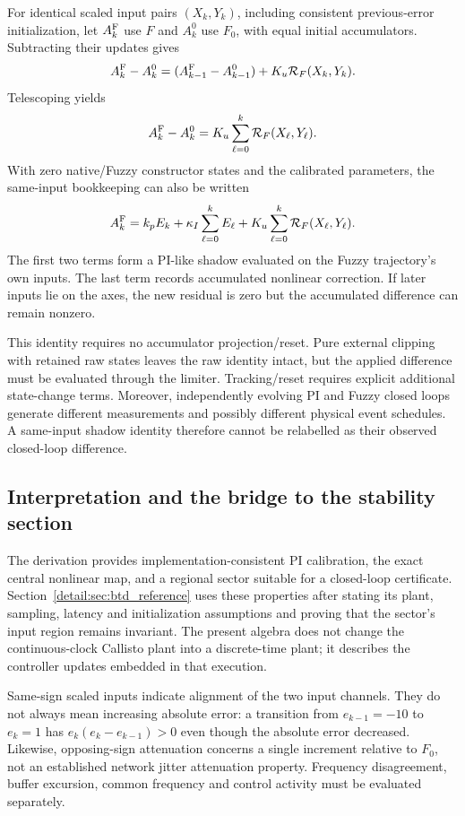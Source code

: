 For identical scaled input pairs $(X_k,Y_k)$, including consistent
previous-error initialization, let $A_k^{\rm F}$ use $F$ and
$A_k^0$ use $F_0$, with equal initial accumulators. Subtracting their
updates gives
\[
 A_k^{\rm F}-A_k^0=(A_{k-1}^{\rm F}-A_{k-1}^0)
                  +K_u\mathcal R_F(X_k,Y_k).
\]
Telescoping yields
\begin{equation}
 A_k^{\rm F}-A_k^0=K_u\sum_{\ell=0}^{k}\mathcal R_F(X_\ell,Y_\ell).
 \label{detail:eq:fpi_memory}
\end{equation}
With zero native/Fuzzy constructor states and the calibrated parameters,
the same-input bookkeeping can also be written
\begin{equation}
 A_k^{\rm F}=k_pE_k+\kappa_I\sum_{\ell=0}^{k}E_\ell
             +K_u\sum_{\ell=0}^{k}\mathcal R_F(X_\ell,Y_\ell).
 \label{detail:eq:fpd_accounting}
\end{equation}
The first two terms form a PI-like shadow evaluated on the Fuzzy
trajectory's own inputs. The last term records accumulated nonlinear
correction. If later inputs lie on the axes, the new residual is zero
but the accumulated difference can remain nonzero.

This identity requires no accumulator projection/reset. Pure external
clipping with retained raw states leaves the raw identity intact, but the
applied difference must be evaluated through the limiter. Tracking/reset
requires explicit additional state-change terms. Moreover, independently
evolving PI and Fuzzy closed loops generate different measurements and
possibly different physical event schedules. A same-input shadow identity
therefore cannot be relabelled as their observed closed-loop difference.

\subsection{Interpretation and the bridge to the stability section}

The derivation provides implementation-consistent PI calibration,
the exact central nonlinear map, and a regional sector suitable for a
closed-loop certificate. Section~\ref{detail:sec:btd_reference} uses these properties after stating its
plant, sampling, latency and initialization assumptions and proving that
the sector's input region remains invariant. The present algebra does not
change the continuous-clock Callisto plant into a discrete-time plant;
it describes the controller updates embedded in that execution.

Same-sign scaled inputs indicate alignment of the two input channels.
They do not always mean increasing absolute error: a transition from
$e_{k-1}=-10$ to $e_k=1$ has $e_k(e_k-e_{k-1})>0$ even though the
absolute error decreased. Likewise, opposing-sign attenuation concerns a
single increment relative to $F_0$, not an established network jitter
attenuation property. Frequency disagreement, buffer excursion, common
frequency and control activity must be evaluated separately.

